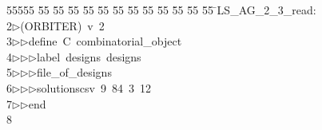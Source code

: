%
%
\begin{tabbing}
55555 \= 55 \= 55 \= 55 \= 55 \= 55 \= 55 \= 55 \= 55 \= 55 \= 55 \= 55 \= 55 \= \>LS\_AG\_2\_3\_read:\\[0pt]
2\>$\triangleright$\>(ORBITER)\ v\ 2\ \\[0pt]
3\>$\triangleright$\>$\triangleright$\>define\ C\ combinatorial\_object\ \\[0pt]
4\>$\triangleright$\>$\triangleright$\>$\triangleright$\>label\ designs\ designs\ \\[0pt]
5\>$\triangleright$\>$\triangleright$\>$\triangleright$\>file\_of\_designs\ \\[0pt]
6\>$\triangleright$\>$\triangleright$\>$\triangleright$\>solutionscsv\ 9\ 84\ 3\ 12\ \\[0pt]
7\>$\triangleright$\>$\triangleright$\>end\\[0pt]
8\>\end{tabbing}
